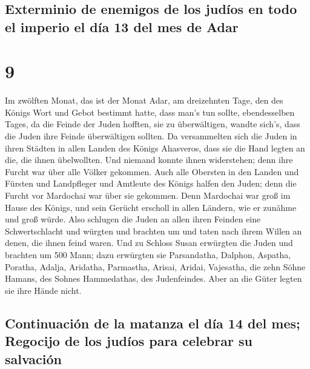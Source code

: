 \hypertarget{exterminio-de-enemigos-de-los-juduxedos-en-todo-el-imperio-el-duxeda-13-del-mes-de-adar}{%
\subsection{Exterminio de enemigos de los judíos en todo el imperio el
día 13 del mes de
Adar}\label{exterminio-de-enemigos-de-los-juduxedos-en-todo-el-imperio-el-duxeda-13-del-mes-de-adar}}

\hypertarget{section-8}{%
\section{9}\label{section-8}}

 Im zwölften Monat, das ist der Monat Adar, am dreizehnten
Tage, den des Königs Wort und Gebot bestimmt hatte, dass man's tun
sollte, ebendesselben Tages, da die Feinde der Juden hofften, sie zu
überwältigen, wandte sich's, dass die Juden ihre Feinde überwältigen
sollten.  Da versammelten sich die Juden in ihren Städten
in allen Landen des Königs Ahasveros, dass sie die Hand legten an die,
die ihnen übelwollten. Und niemand konnte ihnen widerstehen; denn ihre
Furcht war über alle Völker gekommen.  Auch alle Obersten
in den Landen und Fürsten und Landpfleger und Amtleute des Königs halfen
den Juden; denn die Furcht vor Mardochai war über sie gekommen.
 Denn Mardochai war groß im Hause des Königs, und sein
Gerücht erscholl in allen Ländern, wie er zunähme und groß würde.
 Also schlugen die Juden an allen ihren Feinden eine
Schwertschlacht und würgten und brachten um und taten nach ihrem Willen
an denen, die ihnen feind waren.  Und zu Schloss Susan
erwürgten die Juden und brachten um 500 Mann;  dazu
erwürgten sie Parsandatha, Dalphon, Aspatha,  Poratha,
Adalja, Aridatha,  Parmastha, Arisai, Aridai, Vajesatha,
 die zehn Söhne Hamans, des Sohnes Hammedathas, des
Judenfeindes. Aber an die Güter legten sie ihre Hände nicht.

\hypertarget{continuaciuxf3n-de-la-matanza-el-duxeda-14-del-mes-regocijo-de-los-juduxedos-para-celebrar-su-salvaciuxf3n}{%
\subsection{Continuación de la matanza el día 14 del mes; Regocijo de
los judíos para celebrar su
salvación}\label{continuaciuxf3n-de-la-matanza-el-duxeda-14-del-mes-regocijo-de-los-juduxedos-para-celebrar-su-salvaciuxf3n}}

